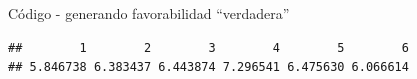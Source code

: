 \documentclass[
  11pt,
  ignorenonframetext,
]{beamer}
\newenvironment{Shaded}{}{}
\newcommand{\AttributeTok}[1]{\textcolor[rgb]{0.49,0.56,0.16}{#1}}
\newcommand{\DecValTok}[1]{\textcolor[rgb]{0.25,0.63,0.44}{#1}}
\newcommand{\FunctionTok}[1]{\textcolor[rgb]{0.02,0.16,0.49}{#1}}
\newcommand{\NormalTok}[1]{#1}
\newcommand{\OtherTok}[1]{\textcolor[rgb]{0.00,0.44,0.13}{#1}}
\newcommand{\SpecialCharTok}[1]{\textcolor[rgb]{0.25,0.44,0.63}{#1}}
\begin{document}
\begin{frame}[fragile]{Código - generando favorabilidad ``verdadera''}
\protect\hypertarget{cuxf3digo---generando-favorabilidad-verdadera}{}
\begin{Shaded}
\end{Shaded}

\begin{verbatim}
##        1        2        3        4        5        6 
## 5.846738 6.383437 6.443874 7.296541 6.475630 6.066614
\end{verbatim}
\end{frame}
\end{document}
